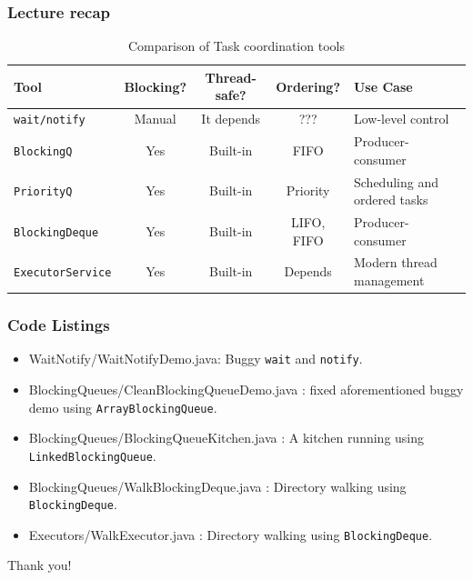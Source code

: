 \documentclass[xcolor={dvipsnames,svgnames},aspectratio=169]{beamer}
\begin{document}
\begin{frame}[fragile]
  \frametitle{Lecture recap}

  \begin{table}[h]
    \centering
    \begin{tabularx}{\textwidth}{|l|c|c|c|X|}
      \hline
      \textbf{Tool} & \textbf{Blocking?} & \textbf{Thread-safe?} & \textbf{Ordering?} & \textbf{Use Case} \\
      \hline
      \texttt{wait/notify} & Manual & It depends & ??? & Low-level control \\
      \hline
      \texttt{BlockingQ} & Yes & Built-in & FIFO & Producer-consumer \\
      \hline
      \texttt{PriorityQ} & Yes & Built-in & Priority & Scheduling and ordered
                                                       tasks \\
      \hline
      \texttt{BlockingDeque} & Yes & Built-in & LIFO, FIFO& Producer-consumer \\
      \hline
      \texttt{ExecutorService} & Yes & Built-in & Depends & Modern thread
                                                            management \\
      \hline
    \end{tabularx}
    \caption{Comparison of Task coordination tools}
  \end{table}
\end{frame}

\begin{frame}[fragile]
  \frametitle{Code Listings}

  \begin{itemize}
  \item[\faCode]<1-> WaitNotify/WaitNotifyDemo.java: Buggy \texttt{wait} and
    \texttt{notify}.
  \item[\faCode]<1-> BlockingQueues/CleanBlockingQueueDemo.java : fixed
    aforementioned buggy demo using \texttt{ArrayBlockingQueue}.
  \item[\faCode]<1-> BlockingQueues/BlockingQueueKitchen.java : A kitchen
    running using \texttt{LinkedBlockingQueue}.
  \item[\faCode]<1-> BlockingQueues/WalkBlockingDeque.java : Directory
    walking using \texttt{BlockingDeque}.
  \item[\faCode]<1-> Executors/WalkExecutor.java : Directory
    walking using \texttt{BlockingDeque}.
  \end{itemize}

\end{frame}

\begin{frame}{}
  \centering \huge
  Thank you!
\end{frame}
\end{document}
